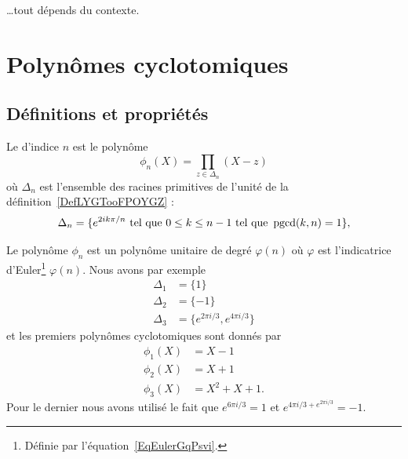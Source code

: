 \noindent \ldots tout dépends du contexte.

\section{Polynômes cyclotomiques}

\subsection{Définitions et propriétés}

\begin{definition}  \label{DefXGHooRAXlpp}
    Le  d'indice \( n\) est le polynôme
    \begin{equation}    \label{EqLjGYKK}
        \phi_n(X)=\prod_{z\in\Delta_n}(X-z)
    \end{equation}
    où \( \Delta_n\) est l'ensemble des racines primitives de l'unité de la définition~\ref{DefLYGTooFPOYGZ} :
    \begin{equation}
        \Delta_n=\{  e^{2ik\pi/n}\text{ tel que } 0\leq k\leq n-1\text{ tel que } \operatorname{pgcd}(k,n)=1 \},
    \end{equation}
\end{definition}

Le polynôme \( \phi_n\) est un polynôme unitaire de degré \( \varphi(n)\) où \( \varphi\) est l'indicatrice d'Euler\footnote{Définie par l'équation~\ref{EqEulerGqPsvi}.} \( \varphi(n)\). Nous avons par exemple
\begin{subequations}
    \begin{align}
        \Delta_1&=\{ 1 \}\\
        \Delta_2&=\{ -1 \}\\
        \Delta_3&=\{  e^{2\pi i/3}, e^{4\pi i/3} \}
    \end{align}
\end{subequations}
et les premiers polynômes cyclotomiques sont donnés par
\begin{subequations}
    \begin{align}
        \phi_1(X)&=X-1\\
        \phi_2(X)&=X+1\\
        \phi_3(X)&=X^2+X+1.
    \end{align}
\end{subequations}
Pour le dernier nous avons utilisé le fait que \(  e^{6\pi i/3}=1\) et \(  e^{4\pi i/3+ e^{2\pi i/3}}=-1\).

